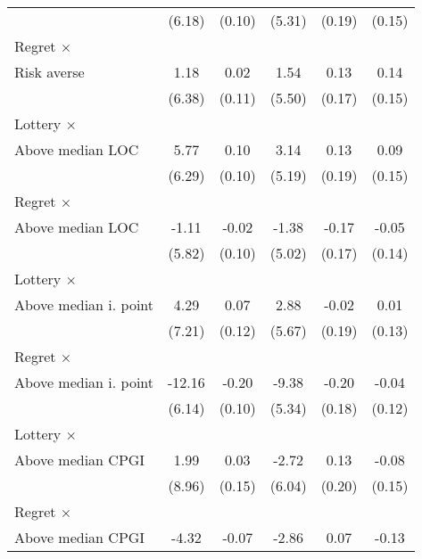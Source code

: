 \begin{table}[htbp]
\begin{tabular}{l*{5}{c}}
                &   (6.18)         &   (0.10)         &   (5.31)         &   (0.19)         &   (0.15)         \\
\addlinespace
Regret $\times$ \\ Risk averse&     1.18         &     0.02         &     1.54         &     0.13         &     0.14         \\
                &   (6.38)         &   (0.11)         &   (5.50)         &   (0.17)         &   (0.15)         \\
\addlinespace
Lottery $\times$ \\ Above median LOC&     5.77         &     0.10         &     3.14         &     0.13         &     0.09         \\
                &   (6.29)         &   (0.10)         &   (5.19)         &   (0.19)         &   (0.15)         \\
\addlinespace
Regret $\times$ \\ Above median LOC&    -1.11         &    -0.02         &    -1.38         &    -0.17         &    -0.05         \\
                &   (5.82)         &   (0.10)         &   (5.02)         &   (0.17)         &   (0.14)         \\
\addlinespace
Lottery $\times$ \\ Above median i. point&     4.29         &     0.07         &     2.88         &    -0.02         &     0.01         \\
                &   (7.21)         &   (0.12)         &   (5.67)         &   (0.19)         &   (0.13)         \\
\addlinespace
Regret $\times$ \\ Above median i. point&   -12.16\sym{**} &    -0.20\sym{**} &    -9.38\sym{*}  &    -0.20         &    -0.04         \\
                &   (6.14)         &   (0.10)         &   (5.34)         &   (0.18)         &   (0.12)         \\
\addlinespace
Lottery $\times$ \\ Above median CPGI&     1.99         &     0.03         &    -2.72         &     0.13         &    -0.08         \\
                &   (8.96)         &   (0.15)         &   (6.04)         &   (0.20)         &   (0.15)         \\
\addlinespace
Regret $\times$ \\ Above median CPGI&    -4.32         &    -0.07         &    -2.86         &     0.07         &    -0.13         \\

\end{tabular}
\end{table}
